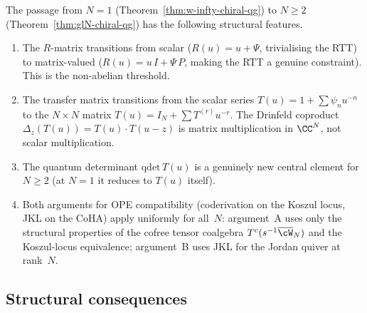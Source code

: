 \begin{remark}[The $N = 1 \to N \geq 2$ transition]
\label{rem:glN-transition}
The passage from $N = 1$
(Theorem~\ref{thm:w-infty-chiral-qg}) to $N \geq 2$
(Theorem~\ref{thm:glN-chiral-qg}) has the following
structural features.
\begin{enumerate}[label=\textup{(\arabic*)}]
\item The $R$-matrix transitions from scalar
  ($R(u) = u + \Psi$, trivialising the RTT) to
  matrix-valued ($R(u) = u\, I + \Psi\, P$, making
  the RTT a genuine constraint). This is the
  non-abelian threshold.
\item The transfer matrix transitions from the scalar
  series $T(u) = 1 + \sum \psi_n u^{-n}$ to the
  $N \times N$ matrix
  $T(u) = I_N + \sum T^{(r)} u^{-r}$.
  The Drinfeld coproduct
  $\Delta_z(T(u)) = T(u) \cdot T(u - z)$ is matrix
  multiplication in $\CC^N$, not scalar multiplication.
\item The quantum determinant $\mathrm{qdet}\, T(u)$ is a
  genuinely new central element for $N \geq 2$ (at
  $N = 1$ it reduces to $T(u)$ itself).
\item Both arguments for OPE compatibility (coderivation on
  the Koszul locus, JKL on the CoHA) apply uniformly for
  all~$N$: argument~A uses only the structural properties
  of the cofree tensor coalgebra
  $T^c(s^{-1}\overline{\cW}_N)$ and the Koszul-locus
  equivalence; argument~B uses JKL for the Jordan quiver
  at rank~$N$.
\end{enumerate}
\end{remark}


\subsection{Structural consequences}
\label{subsec:structural-consequences}

